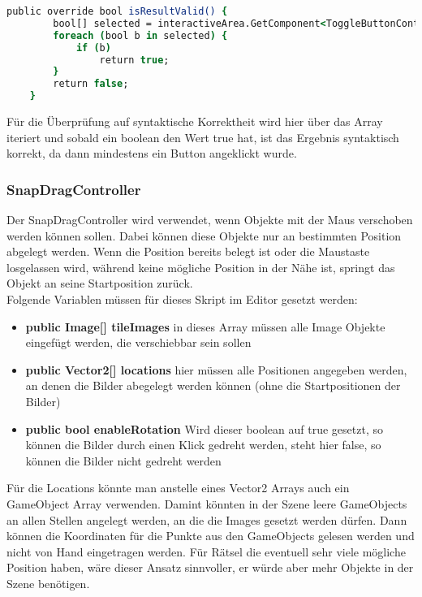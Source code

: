 {\begin{lstlisting}[language=csh, caption={isResultValid Methode in der Klasse von Rätsel 6}]
    public override bool isResultValid() {
        bool[] selected = interactiveArea.GetComponent<ToggleButtonController>().buttonStates;
        foreach (bool b in selected) {
            if (b)
                return true;
        }
        return false;
    }
\end{lstlisting}
Für die Überprüfung auf syntaktische Korrektheit wird hier über das Array iteriert und sobald ein boolean den Wert true hat, ist das Ergebnis syntaktisch korrekt, da dann mindestens ein Button angeklickt wurde.

\subsubsection{SnapDragController}
Der SnapDragController wird verwendet, wenn Objekte mit der Maus verschoben werden können sollen. Dabei können diese Objekte nur an bestimmten Position abgelegt werden. Wenn die Position bereits belegt ist oder die Maustaste losgelassen wird, während keine mögliche Position in der Nähe ist, springt das Objekt an seine Startposition zurück.\\
Folgende Variablen müssen für dieses Skript im Editor gesetzt werden:
\begin{itemize}
\item \textbf{ public Image[] tileImages} in dieses Array müssen alle Image Objekte eingefügt werden, die verschiebbar sein sollen
\item \textbf{public Vector2[] locations} hier müssen alle Positionen angegeben werden, an denen die Bilder abegelegt werden können (ohne die Startpositionen der Bilder)
\item \textbf{public bool enableRotation} Wird dieser boolean auf true gesetzt, so können die Bilder durch einen Klick gedreht werden, steht hier false, so können die Bilder nicht gedreht werden
\end{itemize}
Für die Locations könnte man anstelle eines Vector2 Arrays auch ein GameObject Array verwenden. Damint könnten in der Szene leere GameObjects an allen Stellen angelegt werden, an die die Images gesetzt werden dürfen. Dann können die Koordinaten für die Punkte aus den GameObjects gelesen werden und nicht von Hand eingetragen werden. Für Rätsel die eventuell sehr viele mögliche Position haben, wäre dieser Ansatz sinnvoller, er würde aber mehr Objekte in der Szene benötigen.

}
